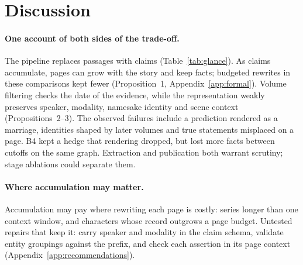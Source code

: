 \section{Discussion}
\label{sec:discussion}

\paragraph{One account of both sides of the trade-off.}
The pipeline replaces passages with claims (Table~\ref{tab:glance}). As claims accumulate,
pages can grow with the story and keep facts; budgeted rewrites in these comparisons kept
fewer (Proposition~1, Appendix~\ref{app:formal}). Volume filtering checks the date of the
evidence, while the representation weakly preserves speaker, modality, namesake identity and
scene context (Propositions~2--3). The observed failures include a prediction rendered as a
marriage, identities shaped by later volumes and true statements misplaced on a page. B4 kept a hedge that rendering dropped, but lost more facts between cutoffs on
the same graph. Extraction and publication both warrant scrutiny; stage ablations could
separate them.

\paragraph{Where accumulation may matter.}
Accumulation may pay where rewriting each page is costly: series longer than one context
window, and characters whose record outgrows a page budget. Untested repairs that keep it:
carry speaker and modality in the claim schema, validate entity groupings against the
prefix, and check each assertion in its page context (Appendix~\ref{app:recommendations}).
